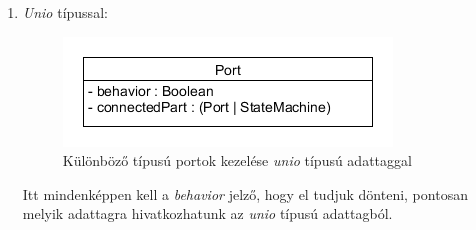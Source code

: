 \documentclass[a4paper,12pt]{report}
\begin{document}
\begin{enumerate}
\item \textit{Unio} típussal: \\

\begin{figure}[H]
\begin{center}
\includegraphics[scale=0.7]{unio_port_diag.png}
\end{center}
\caption{Különböző típusú portok kezelése \textit{unio} típusú adattaggal}
\end{figure}

Itt mindenképpen kell a \textit{behavior} jelző, hogy el tudjuk dönteni, pontosan melyik adattagra hivatkozhatunk az \textit{unio} típusú adattagból. 
\end{enumerate}
\end{document}
